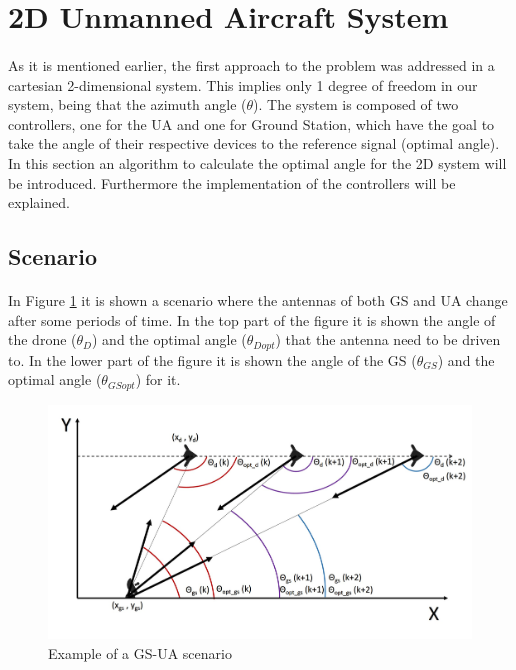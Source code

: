 
\section{2D Unmanned Aircraft System}\label{sec:2d_sim}
\paragraph{}As it is mentioned earlier, the first approach to the problem was addressed in a cartesian 2-dimensional system. This implies only 1 degree of freedom in our system, being that the azimuth angle ($\theta$). The system is composed of two controllers, one for the UA and one for Ground Station, which have the goal to take the angle of their respective devices to the reference signal (optimal angle). In this section an algorithm to calculate the optimal angle for the 2D system will be introduced. Furthermore the implementation of the controllers will be explained.

\subsection*{Scenario}
\paragraph{}In Figure \ref{fig:ua_gs} it is shown a scenario where the antennas of both GS and UA change after some periods of time. In the top part of the figure it is shown the angle of the drone ($\theta_{D}$) and the optimal angle ($\theta_{Dopt}$) that the antenna need to be driven to. In the lower part of the figure it is shown the angle of the GS ($\theta_{GS}$) and the optimal angle ($\theta_{GSopt}$) for it. 

\begin{figure}[h]
	\centering
	
	\includegraphics[scale=0.45]{figures/drone_gs_ex_1.jpg}
	\caption{Example of a GS-UA scenario}
	\label{fig:ua_gs}
\end{figure}


